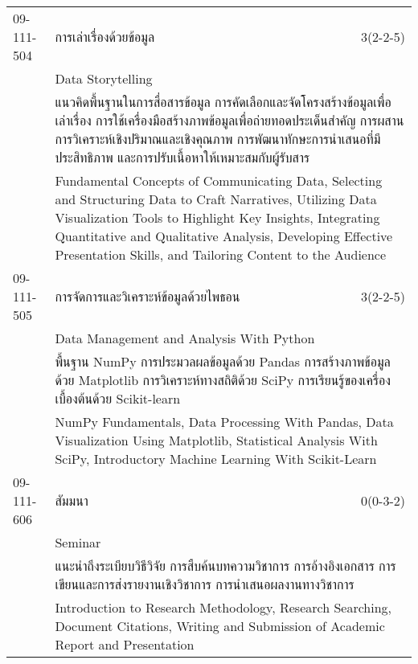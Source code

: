 \begin{longtable}{p{}p{}r{}}
09-111-504 & การเล่าเรื่องด้วยข้อมูล & 3(2-2-5)\\*
 & Data Storytelling & \phantom{x} \vspace{3mm} \\*
&  \multicolumn{2}{p{0.75\textwidth}}{แนวคิดพื้นฐานในการสื่อสารข้อมูล การคัดเลือกและจัดโครงสร้างข้อมูลเพื่อเล่าเรื่อง การใช้เครื่องมือสร้างภาพข้อมูลเพื่อถ่ายทอดประเด็นสำคัญ การผสานการวิเคราะห์เชิงปริมาณและเชิงคุณภาพ การพัฒนาทักษะการนำเสนอที่มีประสิทธิภาพ และการปรับเนื้อหาให้เหมาะสมกับผู้รับสาร} \vspace{3mm} \\*
&  \multicolumn{2}{p{0.75\textwidth}}{Fundamental Concepts of Communicating Data, Selecting and Structuring Data to Craft Narratives, Utilizing Data Visualization Tools to Highlight Key Insights, Integrating Quantitative and Qualitative Analysis, Developing Effective Presentation Skills, and Tailoring Content to the Audience} \vspace{8mm} \\*
09-111-505 & การจัดการและวิเคราะห์ข้อมูลด้วยไพธอน & 3(2-2-5)\\*
 & Data Management and Analysis With Python & \phantom{x} \vspace{3mm} \\*
&  \multicolumn{2}{p{0.75\textwidth}}{พื้นฐาน NumPy การประมวลผลข้อมูลด้วย Pandas การสร้างภาพข้อมูลด้วย Matplotlib การวิเคราะห์ทางสถิติด้วย SciPy การเรียนรู้ของเครื่องเบื้องต้นด้วย Scikit-learn} \vspace{3mm} \\*
&  \multicolumn{2}{p{0.75\textwidth}}{NumPy Fundamentals, Data Processing With Pandas, Data Visualization Using Matplotlib, Statistical Analysis With SciPy, Introductory Machine Learning With Scikit-Learn} \vspace{8mm} \\*
09-111-606 & สัมมนา & 0(0-3-2)\\*
 & Seminar & \phantom{x} \vspace{3mm} \\*
&  \multicolumn{2}{p{0.75\textwidth}}{แนะนำถึงระเบียบวิธีวิจัย การสืบค้นบทความวิชาการ การอ้างอิงเอกสาร การเขียนและการส่งรายงานเชิงวิชาการ การนำเสนอผลงานทางวิชาการ} \vspace{3mm} \\*
&  \multicolumn{2}{p{0.75\textwidth}}{Introduction to Research Methodology, Research Searching, Document Citations, Writing and Submission of Academic Report and Presentation} \vspace{8mm} \\*
\end{longtable}
